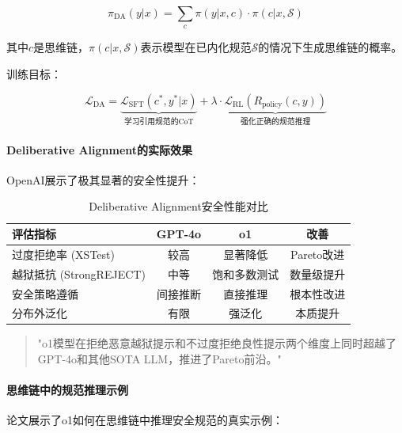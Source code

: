 \documentclass[12pt,a4paper]{article}
\begin{document}
\begin{equation}
\pi_{\text{DA}}(y|x) = \sum_c \pi(y|x, c) \cdot \pi(c|x, \mathcal{S})
\end{equation}

其中$c$是思维链，$\pi(c|x, \mathcal{S})$表示模型在已内化规范$\mathcal{S}$的情况下生成思维链的概率。

训练目标：

\begin{equation}
\mathcal{L}_{\text{DA}} = \underbrace{\mathcal{L}_{\text{SFT}}(c^*, y^*|x)}_{\text{学习引用规范的CoT}} + \lambda \cdot \underbrace{\mathcal{L}_{\text{RL}}(R_{\text{policy}}(c, y))}_{\text{强化正确的规范推理}}
\end{equation}

\paragraph{Deliberative Alignment的实际效果}

OpenAI展示了极其显著的安全性提升：

\begin{table}[H]
\centering
\caption{Deliberative Alignment安全性能对比}
\begin{tabular}{lccc}
\toprule
\textbf{评估指标} & \textbf{GPT-4o} & \textbf{o1} & \textbf{改善} \\
\midrule
过度拒绝率 (XSTest) & 较高 & 显著降低 & Pareto改进 \\
越狱抵抗 (StrongREJECT) & 中等 & 饱和多数测试 & 数量级提升 \\
安全策略遵循 & 间接推断 & 直接推理 & 根本性改进 \\
分布外泛化 & 有限 & 强泛化 & 本质提升 \\
\bottomrule
\end{tabular}
\end{table}

\begin{quote}
"o1模型在拒绝恶意越狱提示和不过度拒绝良性提示两个维度上同时超越了GPT-4o和其他SOTA LLM，推进了Pareto前沿。"
\end{quote}

\paragraph{思维链中的规范推理示例}

论文展示了o1如何在思维链中推理安全规范的真实示例：
\end{document}
